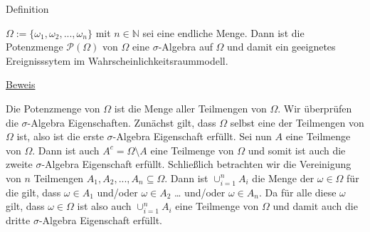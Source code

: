 \documentclass[
  8pt,
  ignorenonframetext,
]{beamer}
\begin{document}
\begin{frame}{Definition}
\protect\hypertarget{definition-6}{}
\small
\begin{theorem}
\justifying
\normalfont
$\Omega := \{\omega_1,\omega_2,...,\omega_n\}$ mit $n \in \mathbb{N}$  sei eine endliche
Menge. Dann ist die Potenzmenge $\mathcal{P}(\Omega)$ von $\Omega$ eine 
$\sigma$-Algebra auf $\Omega$ und damit ein geeignetes Ereignisssytem im 
Wahrscheinlichkeitsraummodell.
\end{theorem}

\footnotesize

\underline{Beweis} \justifying

Die Potenzmenge von \(\Omega\) ist die Menge aller Teilmengen von
\(\Omega\). Wir überprüfen die \(\sigma\)-Algebra Eigenschaften.
Zunächst gilt, dass \(\Omega\) selbst eine der Teilmengen von \(\Omega\)
ist, also ist die erste \(\sigma\)-Algebra Eigenschaft erfüllt. Sei nun
\(A\) eine Teilmenge von \(\Omega\). Dann ist auch
\(A^c = \Omega \setminus A\) eine Teilmenge von \(\Omega\) und somit ist
auch die zweite \(\sigma\)-Algebra Eigenschaft erfüllt. Schließlich
betrachten wir die Vereinigung von \(n\) Teilmengen
\(A_1, A_2, ...,A_n \subseteq \Omega\). Dann ist \(\cup_{i=1}^n A_i\)
die Menge der \(\omega \in \Omega\) für die gilt, dass
\(\omega \in A_1\) und/oder \(\omega \in A_2\) \ldots{} und/oder
\(\omega \in A_n\). Da für alle diese \(\omega\) gilt, dass
\(\omega \in \Omega\) ist also auch \(\cup_{i=1}^n A_i\) eine Teilmenge
von \(\Omega\) und damit auch die dritte \(\sigma\)-Algebra Eigenschaft
erfüllt.

\vfill
\end{frame}
\end{document}
